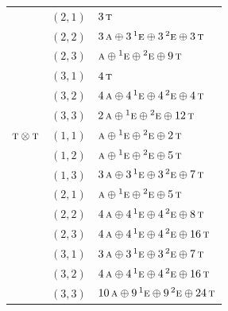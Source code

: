 \documentclass[11pt]{article}
\newcommand{\irr}[1]{\text{\normalfont\scshape #1}}
\newcommand{\conjpair}[1]{{}^{#1}}
\begin{document}
\begin{longtable}{p{} c p{}}
 & $(2,1)$ & $3\,\irr{t}$\\

 & $(2,2)$ & $3\,\irr{a}\oplus 3\,\conjpair{1}\irr{e}\oplus 3\,\conjpair{2}\irr{e}\oplus 3\,\irr{t}$\\

 & $(2,3)$ & $\irr{a}\oplus \conjpair{1}\irr{e}\oplus \conjpair{2}\irr{e}\oplus 9\,\irr{t}$\\

 & $(3,1)$ & $4\,\irr{t}$\\

 & $(3,2)$ & $4\,\irr{a}\oplus 4\,\conjpair{1}\irr{e}\oplus 4\,\conjpair{2}\irr{e}\oplus 4\,\irr{t}$\\

 & $(3,3)$ & $2\,\irr{a}\oplus \conjpair{1}\irr{e}\oplus \conjpair{2}\irr{e}\oplus 12\,\irr{t}$\\

\hline

$\irr{t}\otimes \irr{t}$ & $(1,1)$ & $\irr{a}\oplus \conjpair{1}\irr{e}\oplus \conjpair{2}\irr{e}\oplus 2\,\irr{t}$\\

 & $(1,2)$ & $\irr{a}\oplus \conjpair{1}\irr{e}\oplus \conjpair{2}\irr{e}\oplus 5\,\irr{t}$\\

 & $(1,3)$ & $3\,\irr{a}\oplus 3\,\conjpair{1}\irr{e}\oplus 3\,\conjpair{2}\irr{e}\oplus 7\,\irr{t}$\\

 & $(2,1)$ & $\irr{a}\oplus \conjpair{1}\irr{e}\oplus \conjpair{2}\irr{e}\oplus 5\,\irr{t}$\\

 & $(2,2)$ & $4\,\irr{a}\oplus 4\,\conjpair{1}\irr{e}\oplus 4\,\conjpair{2}\irr{e}\oplus 8\,\irr{t}$\\

 & $(2,3)$ & $4\,\irr{a}\oplus 4\,\conjpair{1}\irr{e}\oplus 4\,\conjpair{2}\irr{e}\oplus 16\,\irr{t}$\\

 & $(3,1)$ & $3\,\irr{a}\oplus 3\,\conjpair{1}\irr{e}\oplus 3\,\conjpair{2}\irr{e}\oplus 7\,\irr{t}$\\

 & $(3,2)$ & $4\,\irr{a}\oplus 4\,\conjpair{1}\irr{e}\oplus 4\,\conjpair{2}\irr{e}\oplus 16\,\irr{t}$\\

 & $(3,3)$ & $10\,\irr{a}\oplus 9\,\conjpair{1}\irr{e}\oplus 9\,\conjpair{2}\irr{e}\oplus 24\,\irr{t}$\\

\hline

\end{longtable}
\end{document}
